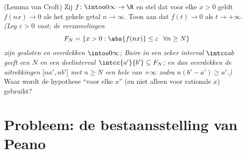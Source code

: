 \begin{exercise}[$\star\star\star$]\label{exo:b3:complete:12}
(Lemma van Croft) Zij $f\colon\intoo0\infty\to\R$  en stel
dat voor elke $x > 0$ geldt $f(nx) \to 0$ als het gehele getal $n
\to \infty$. Toon aan dat $f(t) \to 0$ als $t \to +\infty$.
\emph{(Leg $\varepsilon > 0$ vast; de verzamelingen
\[
F_N = \{x > 0 : \abs{f(nx)} \leq \varepsilon\ \ \forall n
\geq N\}
\]
zijn gesloten en overdekken $\intoo0\infty$; Baire in een zeker
interval $\intcc ab$ geeft een $N$ en een deelinterval
$\intcc{a'}{b'} \subseteq F_N$; en dan overdekken de
uitrekkingen $\bigl[na', nb'\bigr]$ met $n \geq N$ een hele
 van $+\infty$ zodra $n(b' - a') \geq a'$.)} Waar wordt de
hypothese ``voor elke $x$'' (en niet alleen voor rationale $x$)
gebruikt?
\end{exercise}

\section{Probleem: de bestaansstelling van Peano}

